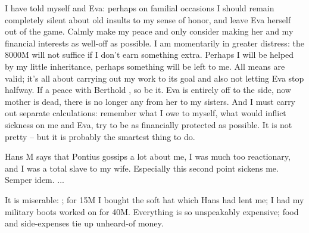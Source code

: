 I have told myself and Eva: perhaps on familial occasions I should remain completely silent about old insults to my sense of honor, and leave Eva herself out of the game. Calmly make my peace and only consider making her and my financial interests as well-off as possible. I am momentarily in greater distress: the 8000M will not suffice if I don't earn something extra. Perhaps I will be helped by my little inheritance, perhaps something will be left to me. All means are valid; it's all about carrying out my work to its goal and also not letting Eva stop halfway. If a peace with Berthold , so be it. Eva is entirely off to the side, now mother is dead, there is no longer any  from her to my sisters. And I must carry out separate calculations: remember what I owe to myself,  what would inflict sickness on me and Eva, try to be as financially protected as possible. It is not pretty -- but it is probably the smartest thing to do.

Hans M says that Pontius gossips a lot about me, I was much too reactionary, and I was a total slave to my wife. Especially this second point sickens me. Semper idem. {...}

It is miserable: ; for 15M I bought the soft hat which Hans had lent me; I had my military boots worked on for 40M. Everything is so unspeakably expensive; food and side-expenses tie up unheard-of money.